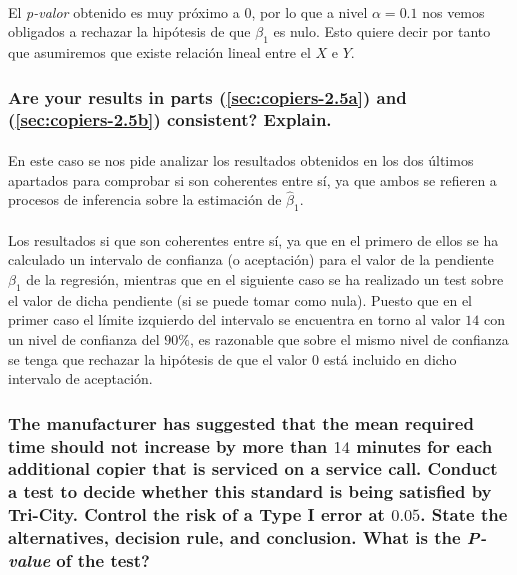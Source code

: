 \documentclass{article}
\begin{document}
        \paragraph{}
        El \emph{p-valor} obtenido es muy próximo a $0$, por lo que a nivel $\alpha = 0.1$ nos vemos obligados a rechazar la hipótesis de que $\beta_1$ es nulo. Esto quiere decir por tanto que asumiremos que existe relación lineal entre el $X$ e $Y$.

      \subsubsection{Are your results in parts (\ref{sec:copiers-2.5a}) and (\ref{sec:copiers-2.5b}) consistent? Explain.}

        \paragraph{}
        En este caso se nos pide analizar los resultados obtenidos en los dos últimos apartados para comprobar si son coherentes entre sí, ya que ambos se refieren a procesos de inferencia sobre la estimación de $\widehat{\beta}_1$.

        \paragraph{}
        Los resultados si que son coherentes entre sí, ya que en el primero de ellos se ha calculado un intervalo de confianza (o aceptación) para el valor de la pendiente $\beta_1$ de la regresión, mientras que en el siguiente caso se ha realizado un test sobre el valor de dicha pendiente (si se puede tomar como nula). Puesto que en el primer caso el límite izquierdo del intervalo se encuentra en torno al valor $14$ con un nivel de confianza del $90\%$, es razonable que sobre el mismo nivel de confianza se tenga que rechazar la hipótesis de que el valor $0$ está incluido en dicho intervalo de aceptación.

      \subsubsection{The manufacturer has suggested that the mean required time should not increase by more
than $14$ minutes for each additional copier that is serviced on a service call. Conduct a test to decide whether this standard is being satisfied by Tri-City. Control the risk of a Type I error at $0.05$. State the alternatives, decision rule, and conclusion. What is the \emph{P-value} of the test?}
\end{document}
